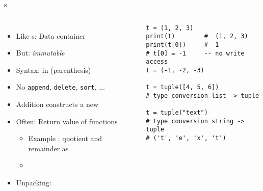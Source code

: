 
\begin{frame}[fragile]{s}
%
\begin{columns}[T]
\begin{itemize}
\item Like s: Data container
\item But: \emph{immutable}
\item Syntax: in (parenthesis)
\item No \texttt{append}, \texttt{delete}, \texttt{sort}, ...
\item Addition constructs a new 
\item Often: Return value of functions
	\begin{itemize}
	\item Example : quotient and remainder as 
	\item {} \thus ~ 
	\end{itemize}
\item Unpacking: 
\end{itemize}
%
\begin{codebox}
\begin{verbatim}
t = (1, 2, 3)
print(t)        #  (1, 2, 3)
print(t[0])     #  1
# t[0] = -1     -- no write access
t = (-1, -2, -3)

t = tuple([4, 5, 6])
# type conversion list -> tuple

t = tuple("text")
# type conversion string -> tuple
# ('t', 'e', 'x', 't')
\end{verbatim}
\end{codebox}
\end{columns}
%
\end{frame}


